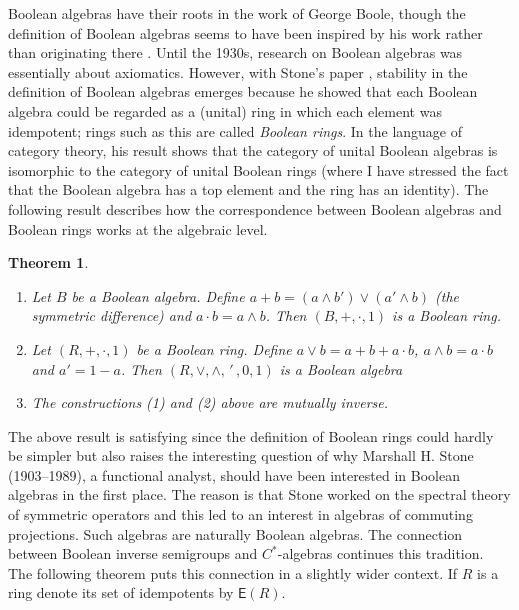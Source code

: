 \documentclass[a4paper]{amsart}
\newtheorem{theorem}{Theorem}[section]
\begin{document}
Boolean algebras have their roots in the work of George Boole, though the definition of Boolean algebras seems to have been inspired by his work rather than originating there \cite{Burris, TH}.
Until the 1930s, research on Boolean algebras was essentially about axiomatics.
However, with Stone's paper \cite{Stone1936}, stability in the definition of Boolean algebras emerges because he showed that each Boolean algebra
could be regarded as a (unital) ring in which each element was idempotent;
rings such as this are called {\em Boolean rings}.
In the language of category theory, his result shows that the category of unital Boolean algebras is isomorphic to the category of unital Boolean rings
(where I have stressed the fact that the Boolean algebra has a top element and the ring has an identity).
The following result describes how the correspondence between Boolean algebras and Boolean rings works at the algebraic level.

\begin{theorem}\label{them:bool-ring} \mbox{}
\begin{enumerate}

\item Let $B$ be a Boolean algebra. Define $a + b = (a \wedge b') \vee (a' \wedge b)$ (the symmetric difference)
and $a \cdot b = a \wedge b$.
Then $(B, +, \cdot, 1)$ is a Boolean ring.

\item Let $(R, +, \cdot, 1)$ be a Boolean ring.
Define  $a \vee b = a + b + a \cdot b$, $a \wedge b = a \cdot b$ and $a' = 1 - a$.
Then $(R, \vee, \wedge, \, ' \, , 0,1)$ is a Boolean algebra

\item The constructions (1) and (2) above are mutually inverse. 

\end{enumerate}
\end{theorem}

The above result is satisfying since the definition of Boolean rings could hardly be simpler
but also raises the interesting question of why Marshall H. Stone (1903--1989), a functional analyst, 
should have been interested in Boolean algebras in the first place.
The reason is that Stone worked on the spectral theory of symmetric operators 
and this led to an interest in algebras of commuting projections.
Such algebras are naturally Boolean algebras.
The connection between Boolean inverse semigroups and $C^{\ast}$-algebras
continues this tradition.
The following theorem \cite{Foster} puts this connection in a slightly wider context.
If $R$ is a ring denote its set of idempotents by $\mathsf{E}(R)$.
 
\end{document}
